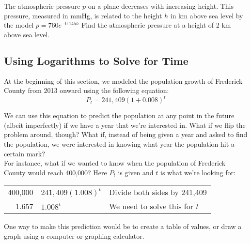 \begin{try}
The atmospheric pressure $p$ on a plane decreases with increasing height.  This pressure, measured in mmHg, is related to the height $h$ in km above sea level by the model $p=760e^{-0.145h}$  Find the atmospheric pressure at a height of 2 km above sea level.
\end{try}

\subsection{Using Logarithms to Solve for Time}
At the beginning of this section, we modeled the population growth of Frederick County from 2013 onward using the following equation:
\vspace{0.1in}
\[P_t = 241,409(1+0.008)^t\]
\vspace{0.1in}

We can use this equation to predict the population at any point in the future (albeit imperfectly) if we have a year that we're interested in.  What if we flip the problem around, though?  What if, instead of being given a year and asked to find the population, we were interested in knowing what year the population hit a certain mark? \\ 

For instance, what if we wanted to know when the population of Frederick County would reach 400,000?  Here $P_t$ is given and $t$ is what we're looking for:
\vspace{0.1in}

\begin{center}
\begin{tabular}{r @{ $=$ } l l}
400,000 & $241,409(1.008)^t$ & Divide both sides by 241,409\\
1.657 & $1.008^t$ & We need to solve this for $t$
\end{tabular}
\end{center}
\vfill
\pagebreak

One way to make this prediction would be to create a table of values, or draw a graph using a computer or graphing calculator.
\begin{center}
\end{center}

